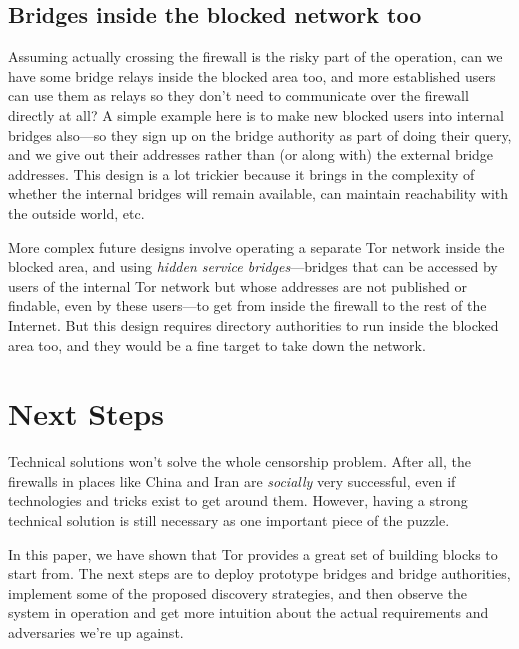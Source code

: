 \documentclass{llncs}
\begin{document}
\subsection{Bridges inside the blocked network too}

Assuming actually crossing the firewall is the risky part of the
operation, can we have some bridge relays inside the blocked area too,
and more established users can use them as relays so they don't need to
communicate over the firewall directly at all? A simple example here is
to make new blocked users into internal bridges also---so they sign up
on the bridge authority as part of doing their query, and we give out
their addresses
rather than (or along with) the external bridge addresses. This design
is a lot trickier because it brings in the complexity of whether the
internal bridges will remain available, can maintain reachability with
the outside world, etc.

More complex future designs involve operating a separate Tor network
inside the blocked area, and using \emph{hidden service bridges}---bridges
that can be accessed by users of the internal Tor network but whose
addresses are not published or findable, even by these users---to get
from inside the firewall to the rest of the Internet. But this design
requires directory authorities to run inside the blocked area too,
and they would be a fine target to take down the network.


\section{Next Steps}
\label{sec:conclusion}

Technical solutions won't solve the whole censorship problem. After all,
the firewalls in places like China and Iran are \emph{socially} very
successful, even if technologies and tricks exist to get around them.
However, having a strong technical solution is still necessary as one
important piece of the puzzle.

In this paper, we have shown that Tor provides a great set of building
blocks to start from. The next steps are to deploy prototype bridges and
bridge authorities, implement some of the proposed discovery strategies,
and then observe the system in operation and get more intuition about
the actual requirements and adversaries we're up against.

 


\end{document}
